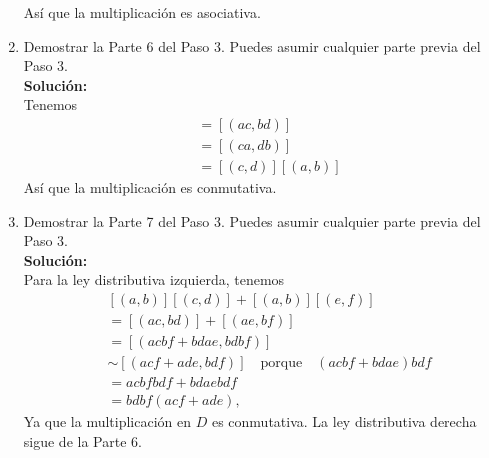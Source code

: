 \begin{enumerate}
	Así que la multiplicación es asociativa.
	
	\item Demostrar la Parte 6 del Paso 3. Puedes asumir cualquier parte previa del Paso 3.
	\\ \textbf{Solución:} \\
	Tenemos 
	\begin{align*}
		[(a, b)][(c, d)] &=[(ac, bd)]  \\
		&= [(ca, db)]\\  &= [(c, d)][(a, b)]
	\end{align*}
	Así que la multiplicación es conmutativa.
	\item Demostrar la Parte 7 del Paso 3. Puedes asumir cualquier parte previa del Paso 3.
	\\ \textbf{Solución:} \\
	Para la ley distributiva izquierda, tenemos
	\[
	\begin{aligned}
		&[(a, b)][(c, d)] + [(a, b)][(e, f )] \\
		&= [(ac, bd)] + [(ae, bf )] \\
		&= [(acbf + bdae, bdbf )] \\
		&\sim [(acf + ade, bdf )] \quad \text{porque} \quad (acbf + bdae)bdf \\
		&= acbf bdf + bdaebdf \\
		&= bdbf (acf + ade),
	\end{aligned}
	\]
	Ya que la multiplicación en \(D\) es conmutativa. La ley distributiva derecha sigue de la Parte 6.
	

\end{enumerate}

